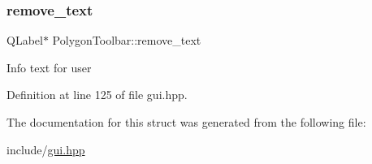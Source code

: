\subsubsection{\texorpdfstring{remove\+\_\+text}{remove\_text}}
{\footnotesize\ttfamily Q\+Label$\ast$ Polygon\+Toolbar\+::remove\+\_\+text}

Info text for user 

Definition at line 125 of file gui.\+hpp.



The documentation for this struct was generated from the following file\+:\begin{DoxyCompactItemize}
\item 
include/\mbox{\hyperlink{gui_8hpp}{gui.\+hpp}}\end{DoxyCompactItemize}
